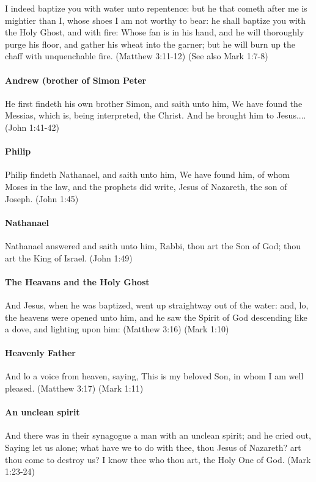 I indeed baptize you with water unto repentence: but he that cometh after me is mightier than I, whose shoes I am not worthy to bear: he shall baptize you with the Holy Ghost, and with fire: Whose fan is in his hand, and he will thoroughly purge his floor, and gather his wheat into the garner; but he will burn up the chaff with unquenchable fire. (Matthew 3:11-12) (See also Mark 1:7-8)

\paragraph{Andrew (brother of Simon Peter}
He first findeth his own brother Simon, and saith unto him, We have found the Messias, which is, being interpreted, the Christ. And he brought him to Jesus.... (John 1:41-42)

\paragraph{Philip}
Philip findeth Nathanael, and saith unto him, We have found him, of whom Moses in the law, and the prophets did write, Jesus of Nazareth, the son of Joseph. (John 1:45)

\paragraph{Nathanael}
Nathanael answered and saith unto him, Rabbi, thou art the Son of God; thou art the King of Israel. (John 1:49)

\paragraph{The Heavans and the Holy Ghost}
And Jesus, when he was baptized, went up straightway out of the water: and, lo, the heavens were opened unto him, and he saw the Spirit of God descending like a dove, and lighting upon him: (Matthew 3:16) (Mark 1:10)

\paragraph{Heavenly Father}
And lo a voice from heaven, saying, This is my beloved Son, in whom I am well pleased. (Matthew 3:17) (Mark 1:11)

\paragraph{An unclean spirit}
And there was in their synagogue a man with an unclean spirit; and he cried out, Saying let us alone; what have we to do with thee, thou Jesus of Nazareth? art thou come to destroy us? I know thee who thou art, the Holy One of God. (Mark 1:23-24)

